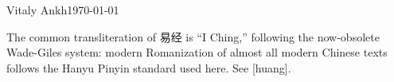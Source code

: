 Vitaly Ankh\today\documentclass[12pt,a4paper,oneside]{scrbook}
\begin{document}
The common transliteration of 易经 is {\enquote{I Ching,}}
following the now-obsolete Wade-Giles system: modern Romanization
of almost all modern Chinese texts follows the Hanyu Pinyin standard used here.
See [huang].
\end{document}
